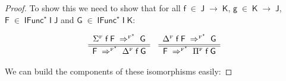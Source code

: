 \documentclass[a4paper]{article}
\newcommand{\Conid}[1]{\mathit{#1}}
\newcommand{\Varid}[1]{\mathit{#1}}
\renewcommand\Varid[1]{\mathord{\textsf{#1}}}
\let\Conid\Varid
\begin{document}
\begin{proof}

To show this we need to show that for all \ensuremath{\Varid{f}\;\in\;\Conid{J}\;\rightarrow\;\Conid{K}}, \ensuremath{\Varid{g}\;\in\;\Conid{K}\;\rightarrow\;\Conid{J}}, \ensuremath{\Conid{F}\;\in\;\Conid{IFunc}^{\star}\;\Conid{I}\;\Conid{J}} and \ensuremath{\Conid{G}\;\in\;\Conid{IFunc}^{\star}\;\Conid{I}\;\Conid{K}}:

\[\begin{array}{c}
\ensuremath{\Sigma^{\text{\tiny F}}\;\Varid{f}\;\Conid{F}\;\Rightarrow^{\text{\tiny F}^{\star}}\;\Conid{G}}
\\\hline\hline
\ensuremath{\Conid{F}\;\Rightarrow^{\text{\tiny F}^{\star}}\;\Delta^{\text{\tiny F}}\;\Varid{f}\;\Conid{G}}\\
\end{array}
\quad
\begin{array}{c}
\ensuremath{\Delta^{\text{\tiny F}}\;\Varid{f}\;\Conid{F}\;\Rightarrow^{\text{\tiny F}^{\star}}\;\Conid{G}}
\\\hline\hline
\ensuremath{\Conid{F}\;\Rightarrow^{\text{\tiny F}^{\star}}\;\Pi^{\text{\tiny F}}\;\Varid{f}\;\Conid{G}}\\
\end{array}
\]

We can build the components of these isomorphisms easily:




\end{proof}
\end{document}
